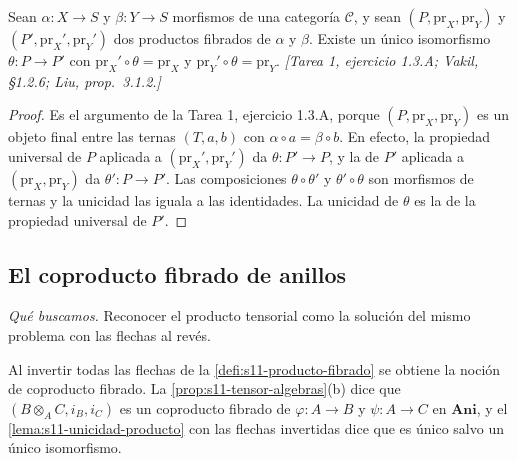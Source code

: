 \begin{lema}
\label{lema:s11-unicidad-producto}
Sean \(\alpha\colon X\to S\) y \(\beta\colon Y\to S\) morfismos de una categoría \(\mathcal C\), y sean \((P,\mathrm{pr}_X,\mathrm{pr}_Y)\) y \((P',\mathrm{pr}_X',\mathrm{pr}_Y')\) dos productos fibrados de \(\alpha\) y \(\beta\). Existe un único isomorfismo \(\theta\colon P\to P'\) con \(\mathrm{pr}_X'\circ\theta=\mathrm{pr}_X\) y \(\mathrm{pr}_Y'\circ\theta=\mathrm{pr}_Y\). \emph{[Tarea 1, ejercicio 1.3.A; Vakil, \S1.2.6; Liu, prop.~3.1.2.]}
\end{lema}
\begin{proof}
Es el argumento de la Tarea 1, ejercicio 1.3.A, porque \((P,\mathrm{pr}_X,\mathrm{pr}_Y)\) es un objeto final entre las ternas \((T,a,b)\) con \(\alpha\circ a=\beta\circ b\). En efecto, la propiedad universal de \(P\) aplicada a \((\mathrm{pr}_X',\mathrm{pr}_Y')\) da \(\theta\colon P'\to P\), y la de \(P'\) aplicada a \((\mathrm{pr}_X,\mathrm{pr}_Y)\) da \(\theta'\colon P\to P'\). Las composiciones \(\theta\circ\theta'\) y \(\theta'\circ\theta\) son morfismos de ternas y la unicidad las iguala a las identidades. La unicidad de \(\theta\) es la de la propiedad universal de \(P'\).
\end{proof}

\subsection{El coproducto fibrado de anillos}
\label{sec:s11-coproducto}

\emph{Qué buscamos.} Reconocer el producto tensorial como la solución del mismo problema con las flechas al revés.

Al invertir todas las flechas de la \cref{defi:s11-producto-fibrado} se obtiene la noción de coproducto fibrado. La \cref{prop:s11-tensor-algebras}(b) dice que \((B\otimes_A C,i_B,i_C)\) es un coproducto fibrado de \(\varphi\colon A\to B\) y \(\psi\colon A\to C\) en \(\mathbf{Ani}\), y el \cref{lema:s11-unicidad-producto} con las flechas invertidas dice que es único salvo un único isomorfismo.

\begin{center}
\end{center}

